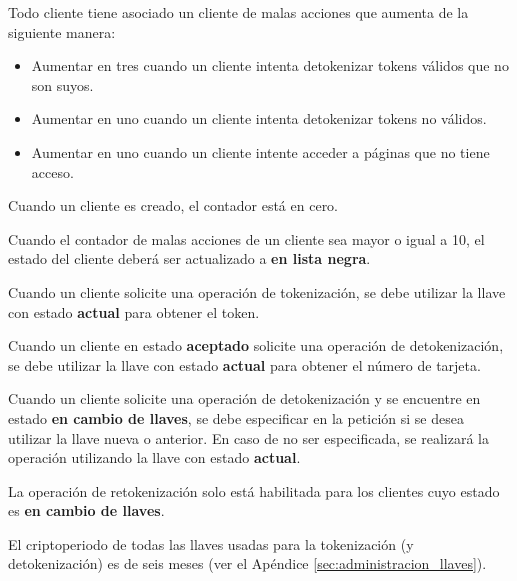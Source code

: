 {
  Todo cliente tiene asociado un cliente de malas acciones que aumenta de la
  siguiente manera:
  \begin{itemize}
    \item Aumentar en tres cuando un cliente intenta detokenizar tokens válidos
      que no son suyos.
    \item Aumentar en uno cuando un cliente intenta detokenizar tokens no
      válidos.
    \item Aumentar en uno cuando un cliente intente acceder a páginas que no
      tiene acceso.
  \end{itemize}

  \begin{hangparas}{2em}{0}
    Cuando un cliente es creado, el contador está en cero.
  \end{hangparas}
}

{
  Cuando el contador de malas acciones de un cliente sea mayor o igual a 10,
  el estado del cliente deberá ser actualizado a  \textbf{en lista negra}.
}

{
  Cuando un cliente solicite una operación de tokenización, se debe utilizar la
  llave con estado \textbf{actual} para obtener el token.
}

{
  Cuando un cliente en estado \textbf{aceptado} solicite una operación de
  detokenización, se debe utilizar la llave con estado \textbf{actual}
  para obtener el número de tarjeta.
}

{
  Cuando un cliente solicite una operación de detokenización y se encuentre en
  estado \textbf{en cambio de llaves}, se debe especificar en la petición si
  se desea utilizar la llave nueva o anterior. En caso de no ser especificada,
  se realizará la operación utilizando la llave con estado \textbf{actual}.
}

{
  La operación de retokenización solo está habilitada para los clientes cuyo
  estado es \textbf{en cambio de llaves}.

}

{
  El criptoperiodo de todas las llaves usadas para la tokenización (y
  detokenización) es de seis meses (ver el Apéndice
  \ref{sec:administracion_llaves}).
}

